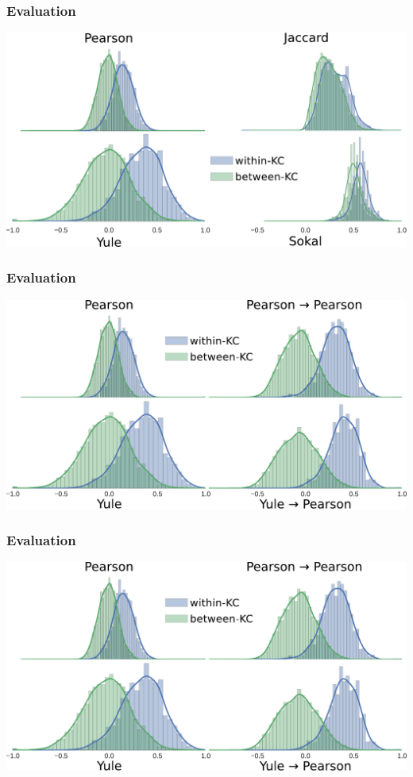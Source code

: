\documentclass[xcolor=svgnames]{beamer}
\begin{document}
\begin{frame}
    \frametitle{Evaluation}
    \includegraphics[width=\linewidth]{figures/measure-histograms}
\end{frame}
\begin{frame}
    \frametitle{Evaluation}
    \includegraphics[width=\linewidth]{figures/measure-histograms2}
\end{frame}
\begin{frame}
    \frametitle{Evaluation}
    \includegraphics[width=\linewidth]{figures/measure-histograms2}
\end{frame}
\end{document}
